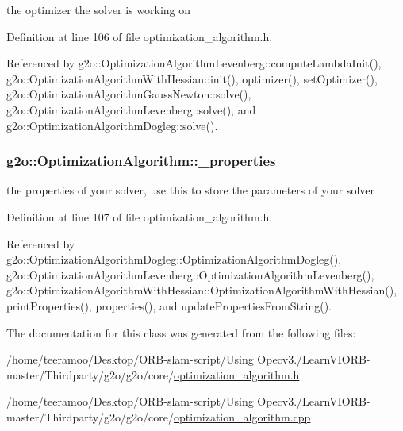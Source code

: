 the optimizer the solver is working on 



Definition at line 106 of file optimization\+\_\+algorithm.\+h.



Referenced by g2o\+::\+Optimization\+Algorithm\+Levenberg\+::compute\+Lambda\+Init(), g2o\+::\+Optimization\+Algorithm\+With\+Hessian\+::init(), optimizer(), set\+Optimizer(), g2o\+::\+Optimization\+Algorithm\+Gauss\+Newton\+::solve(), g2o\+::\+Optimization\+Algorithm\+Levenberg\+::solve(), and g2o\+::\+Optimization\+Algorithm\+Dogleg\+::solve().

\subsubsection[{\texorpdfstring{\+\_\+properties}{_properties}}]{ g2o\+::\+Optimization\+Algorithm\+::\+\_\+properties\hspace{0.3cm}{\ttfamily [protected]}}\hypertarget{classg2o_1_1OptimizationAlgorithm_ae37b494f69b483a3fcafa944e987e325}{}\label{classg2o_1_1OptimizationAlgorithm_ae37b494f69b483a3fcafa944e987e325}


the properties of your solver, use this to store the parameters of your solver 



Definition at line 107 of file optimization\+\_\+algorithm.\+h.



Referenced by g2o\+::\+Optimization\+Algorithm\+Dogleg\+::\+Optimization\+Algorithm\+Dogleg(), g2o\+::\+Optimization\+Algorithm\+Levenberg\+::\+Optimization\+Algorithm\+Levenberg(), g2o\+::\+Optimization\+Algorithm\+With\+Hessian\+::\+Optimization\+Algorithm\+With\+Hessian(), print\+Properties(), properties(), and update\+Properties\+From\+String().



The documentation for this class was generated from the following files\+:\begin{DoxyCompactItemize}
\item 
/home/teeramoo/\+Desktop/\+O\+R\+B-\/slam-\/script/\+Using Opecv3./\+Learn\+V\+I\+O\+R\+B-\/master/\+Thirdparty/g2o/g2o/core/\hyperlink{optimization__algorithm_8h}{optimization\+\_\+algorithm.\+h}\item 
/home/teeramoo/\+Desktop/\+O\+R\+B-\/slam-\/script/\+Using Opecv3./\+Learn\+V\+I\+O\+R\+B-\/master/\+Thirdparty/g2o/g2o/core/\hyperlink{optimization__algorithm_8cpp}{optimization\+\_\+algorithm.\+cpp}\end{DoxyCompactItemize}
